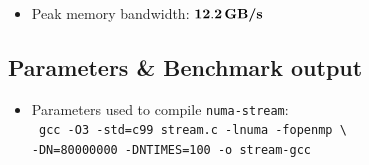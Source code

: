 \documentclass[]{article}
\begin{document}
\begin{itemize}
\begin{itemize}
            \item Peak memory bandwidth: $\bold{12.2} \, \textbf{GB/s}$ \\
        \end{itemize}
\end{itemize}

\subsection{Parameters \& Benchmark output}
\begin{itemize}
    \item Parameters used to compile \texttt{numa-stream}: \\
    \texttt{
        gcc -O3 -std=c99 stream.c -lnuma -fopenmp \textbackslash \\
        -DN=80000000 -DNTIMES=100 -o stream-gcc
    }
    

\end{itemize}
\end{document}
